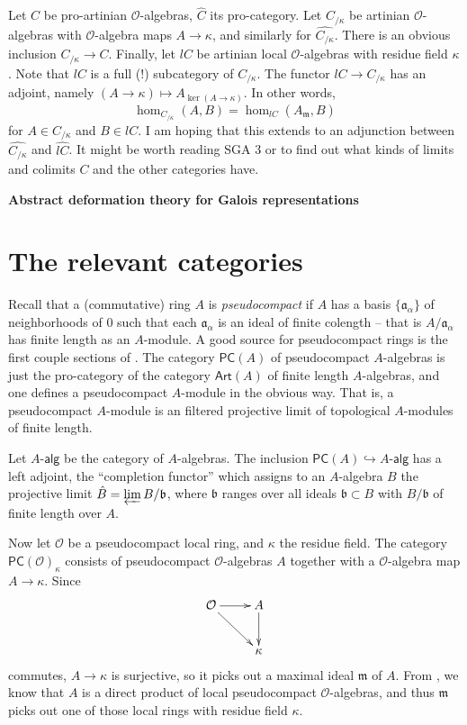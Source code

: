 \documentclass{article}
\newcommand{\cO}{\mathcal{O}}
\newcommand{\fa}{\mathfrak{a}}
\newcommand{\fb}{\mathfrak{b}}
\newcommand{\fm}{\mathfrak{m}}
\newcommand{\pro}{\widehat}
\newcommand{\alg}{\text{-}\mathsf{alg}}
\numberwithin{theorem}{section}
\begin{document}
Let $C$ be pro-artinian $\cO$-algebras, $\pro C$ its pro-category. Let 
$C_{/\kappa}$ be artinian $\cO$-algebras with $\cO$-algebra maps 
$A\to \kappa$, and similarly for $\pro{C_{/\kappa}}$. There is an obvious 
inclusion $C_{/\kappa}\to C$. Finally, let $lC$ be artinian local 
$\cO$-algebras with residue field $\kappa$. Note that $lC$ is a full (!) 
subcategory of $C_{/\kappa}$. The functor 
$lC\to C_{/\kappa}$ has an adjoint, namely 
$(A\to \kappa)\mapsto A_{\ker(A\to\kappa)}$. In other words, 
\[
  \hom_{C_{/\kappa}}(A,B) = \hom_{lC}(A_\fm,B)
\]
for $A\in C_{/\kappa}$ and $B\in lC$. I am hoping that this extends to an 
adjunction between $\pro{C_{/\kappa}}$ and $\pro{lC}$. It might be worth 
reading SGA 3 or \cite{Gr1} to find out what kinds of limits and colimits 
$C$ and the other categories have. 








\newpage
\textbf{Abstract deformation theory for Galois representations}






\section{The relevant categories}

Recall that a (commutative) ring $A$ is \emph{pseudocompact} if $A$ has a 
basis $\{\fa_\alpha\}$ of neighborhoods of $0$ such that each $\fa_\alpha$ is 
an ideal of finite colength -- that is $A/\fa_\alpha$ has finite length as an 
$A$-module. A good source for pseudocompact rings is the first couple sections 
of \cite[VII$_\text{B}$]{SGA3}. The category $\mathsf{PC}(A)$ of pseudocompact 
$A$-algebras is just the pro-category of the category $\mathsf{Art}(A)$ of 
finite length $A$-algebras, and one defines a pseudocompact $A$-module in the 
obvious way. That is, a pseudocompact $A$-module is an filtered projective 
limit of topological $A$-modules of finite length. 

Let $A\alg$ be the category of $A$-algebras. The inclusion 
$\mathsf{PC}(A)\hookrightarrow A\alg$ has a left adjoint, the ``completion 
functor'' which assigns to an $A$-algebra $B$ the projective limit 
$\hat B=\varprojlim B/\fb$, where $\fb$ ranges over all ideals $\fb\subset B$ 
with $B/\fb$ of finite length over $A$. 

Now let $\cO$ be a pseudocompact local ring, and $\kappa$ the residue field. 
The category $\mathsf{PC}(\cO)_\kappa$ consists of pseudocompact 
$\cO$-algebras $A$ together with a $\cO$-algebra map $A\to \kappa$. Since 
\[\xymatrix{
  \cO \ar[r] \ar[dr] & A \ar[d] \\
  & \kappa 
}\]
commutes, $A\to\kappa$ is surjective, so it picks out a maximal ideal 
$\fm$ of $A$. From \cite[VII$_\text{B}$ 0.1.1]{SGA3}, we know that $A$ is a 
direct product of local pseudocompact $\cO$-algebras, and thus $\fm$ picks 
out one of those local rings with residue field $\kappa$. 
\end{document}
